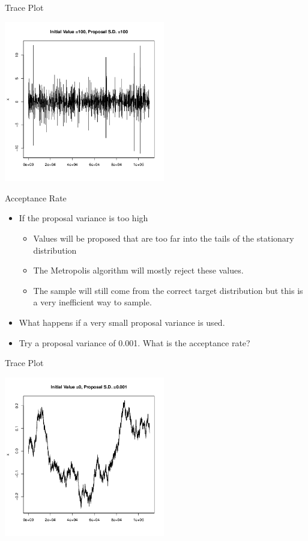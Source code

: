 \documentclass[10pt]{beamer}
\begin{document}
\begin{frame}{Trace Plot}
\begin{center}
\includegraphics[height=7cm]{./Pics/sp4.png}
\end{center}
\end{frame}
\begin{frame}{Acceptance Rate}
\begin{itemize}
\item If the proposal variance is too high

\begin{itemize}
\item Values will be proposed that are too far into the tails of the stationary distribution

\item The Metropolis algorithm will mostly reject these values.

\item The sample will still come from the  correct target distribution but this is a very inefficient way to sample.
\end{itemize}

\item What happens if a very small proposal variance is used.

\item Try a proposal variance of 0.001. What is the acceptance rate?
\end{itemize}
\end{frame}
\begin{frame}{Trace Plot}
\begin{center}
\includegraphics[height=7cm]{./Pics/sp5.png}
\end{center}
\end{frame}
\end{document}
